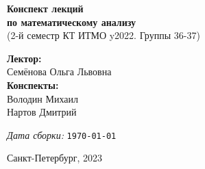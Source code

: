 \documentclass[../main.tex]{subfiles}
\begin{document}
\begin{titlepage}
    \centering
    \vspace*{4cm}
    \Huge \textbf{Конспект лекций \\ по математическому анализу}\\
    \vspace{1cm}
    \large (2-й семестр КТ ИТМО y2022. Группы 36-37)

    \vspace{1cm}

    \begin{flushright} 
        \textbf{Лектор:} \\ Семёнова Ольга Львовна \\ 
        \vspace{1cm}
        \textbf{Конспекты:} \\ Володин Михаил \\ Нартов Дмитрий
    \end{flushright}
    \vspace{4cm}
    \begin{center}
        \emph{Дата сборки:} \texttt{\today}
    \end{center}
    \vfill
    Санкт-Петербург, 2023
\end{titlepage}
\end{document}
